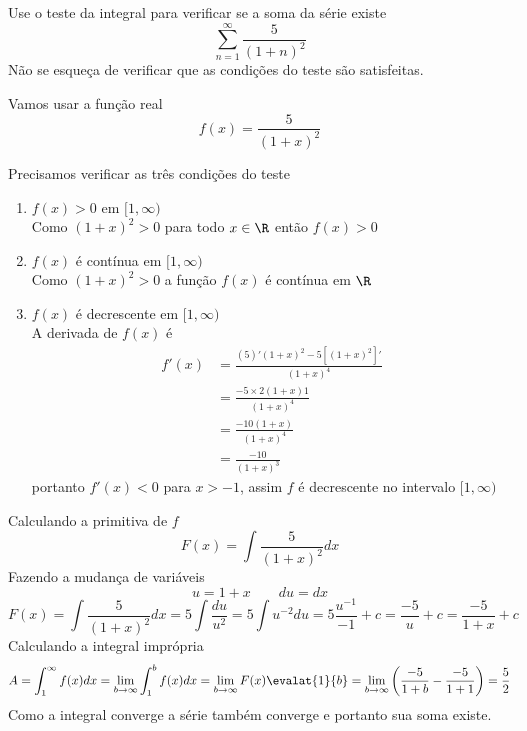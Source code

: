 \documentclass[a4paper,12pt,fleqn]{article}
\begin{document}

Use o teste da integral para verificar se a soma da série existe
\[
  \sum_{n=1}^{\infty} \frac{5}{\left(1+n\right)^2}
\]
Não se esqueça de verificar que as condições do teste são satisfeitas.

\begin{answer}
  Vamos usar a função real
  \[
    f(x) = \frac{5}{\left(1+x\right)^2}
  \]

  Precisamos verificar as três condições do teste
  \begin{enumerate}[label=\roman*)]
    \item \(f(x)>0\) em \([1, \infty)\) \\[2mm]
      Como \((1+x)^2>0\) para todo \(x\in\R\) então \(f(x)>0\)

    \item \(f(x)\) é contínua em \([1, \infty)\) \\[2mm]
      Como \((1+x)^2>0\) a função \(f(x)\) é contínua em \(\R\)

    \item \(f(x)\) é decrescente em  \([1, \infty)\) \\[2mm]
      A derivada de \(f(x)\) é
      \begin{align*}
        f'(x)
        & = \frac
          {(5)'\left(1+x\right)^2 - 5\left[\left(1+x\right)^2\right]'}
          {\left(1+x\right)^4} \\[2mm]
        & = \frac{-5\times 2\left(1+x\right) 1}{\left(1+x\right)^4} \\[2mm]
        & = \frac{-10\left(1+x\right)}{\left(1+x\right)^4} \\[2mm]
        & = \frac{-10}{\left(1+x\right)^3}
      \end{align*}
      portanto \(f'(x)<0\) para \(x>-1\), assim \(f\) é decrescente no intervalo \([1, \infty)\)
  \end{enumerate}
  Calculando a primitiva de \(f\)
  \[
    F(x) = \int \frac{5}{\left(1+x\right)^2} dx
  \]
  Fazendo a mudança de variáveis
  \[
    u = 1+x
    \qquad
    du = dx
  \]
  \[
    F(x)
     = \int \frac{5}{\left(1+x\right)^2} dx
     = 5 \int \frac{du}{u^2}
     = 5 \int u^{-2} du
     = 5 \frac{u^{-1}}{-1} + c
     = \frac{-5}{u} + c
     = \frac{-5}{1+x} + c
  \]
  Calculando a integral imprópria
  \[
    A
    = \int_1^\infty f(x)dx
    = \lim_{b\to\infty}\int_1^b f(x)dx
    = \lim_{b\to\infty} F(x)\evalat{1}{b}
    = \lim_{b\to\infty} \left(\frac{-5}{1+b} - \frac{-5}{1+1}\right)
    = \frac{5}{2}
  \]
  Como a integral converge a série também converge e portanto sua soma existe.
\end{answer}
\end{document}
